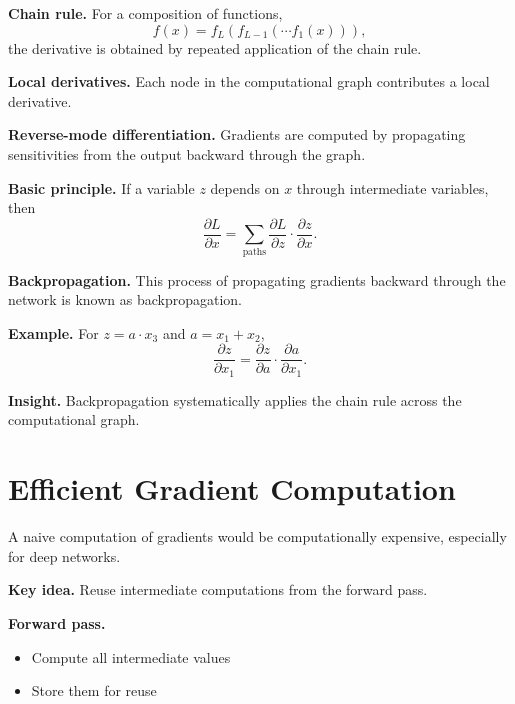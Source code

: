 \medskip

\noindent
\textbf{Chain rule.}  
For a composition of functions,
\[
f(x) = f_L(f_{L-1}(\cdots f_1(x))),
\]
the derivative is obtained by repeated application of the chain rule.

\medskip

\noindent
\textbf{Local derivatives.}  
Each node in the computational graph contributes a local derivative.

\medskip

\noindent
\textbf{Reverse-mode differentiation.}  
Gradients are computed by propagating sensitivities from the output backward through the graph.

\medskip

\noindent
\textbf{Basic principle.}  
If a variable $z$ depends on $x$ through intermediate variables, then
\[
\frac{\partial L}{\partial x} = \sum_{\text{paths}} \frac{\partial L}{\partial z} \cdot \frac{\partial z}{\partial x}.
\]

\medskip

\noindent
\textbf{Backpropagation.}  
This process of propagating gradients backward through the network is known as backpropagation.

\medskip

\noindent
\textbf{Example.}  
For $z = a \cdot x_3$ and $a = x_1 + x_2$,
\[
\frac{\partial z}{\partial x_1} = \frac{\partial z}{\partial a} \cdot \frac{\partial a}{\partial x_1}.
\]

\medskip

\noindent
\textbf{Insight.}  
Backpropagation systematically applies the chain rule across the computational graph.

\section{Efficient Gradient Computation}

A naive computation of gradients would be computationally expensive, especially for deep networks.

\medskip

\noindent
\textbf{Key idea.}  
Reuse intermediate computations from the forward pass.

\medskip

\noindent
\textbf{Forward pass.}
\begin{itemize}
    \item Compute all intermediate values
    \item Store them for reuse
\end{itemize}

